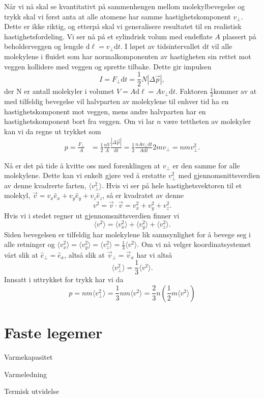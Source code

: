\documentclass[a4paper,norsk,12pt]{article}
\def\d{\ensuremath{\text{d}}}
\def\half{\ensuremath{\frac{1}{2}}}
\begin{document}
Når vi nå skal se kvantitativt på sammenhengen mellom molekylbevegelse og trykk skal vi først anta at alle atomene har samme hastighetskomponent $v_\perp$. Dette er ikke riktig, og etterpå skal vi generalisere resultatet til en realistisk hastighetsfordeling.
Vi ser nå på et sylindrisk volum med endeflate $A$ plassert på beholderveggen og lengde $\d\ell = v_\perp \d t$. I løpet av tidsintervallet $\d t$ vil alle molekylene i fluidet som har normalkomponenten av hastigheten sin rettet mot veggen kollidere med veggen og sprette tilbake. Dette gir impulsen
\begin{displaymath}
	I = F_\perp\d t = \half N|\Delta \vec{p}|,
\end{displaymath}
der N er antall molekyler i volumet $V = A\d\ell  = Av_\perp\d t$. Faktoren \half kommer av at med tilfeldig bevegelse vil halvparten av molekylene til enhver tid ha en hastighetskomponent mot veggen, mens andre halvparten har en hastighetskomponent bort fra veggen. Om vi lar $n$ være tettheten av molekyler kan vi da regne ut trykket som
\begin{displaymath}
\begin{aligned}
	p = \frac{F_\perp}{A} &= \half\frac{nV}{A}\frac{|\Delta \vec{p}|}{\d t} 
	= \half\frac{nAv_\perp\d t}{A\d t}2mv_\perp 
	= nmv_\perp^2.
\end{aligned}
\end{displaymath}

Nå er det på tide å kvitte oss med forenklingen at $v_\perp$ er den samme for alle molekylene. Dette kan vi enkelt gjøre ved å erstatte $v_\perp^2$ med gjennomsnittsverdien av denne kvadrerte farten, $\langle v_\perp^2\rangle$. Hvis vi ser på hele hastighetsvektoren til et molekyl, $\vec{v} = v_x \hat{e}_x +  v_y \hat{e}_y +  v_z \hat{e}_z$, så er kvadratet av denne
\begin{displaymath}
	v^2 = \vec{v}\cdot\vec{v} = v_x^2 + v_y^2+v_z^2.
\end{displaymath}
Hvis vi i stedet regner ut gjennomsnittsverdien finner vi
\begin{displaymath}
	\langle v^2\rangle =\langle v_x^2\rangle +\langle v_y^2\rangle + \langle v_z^2\rangle.
\end{displaymath}
Siden bevegelsen er tilfeldig har molekylene lik sannsynlighet for å bevege seg i alle retninger og $\langle v_x^2\rangle = \langle v_y^2\rangle = \langle v_z^2\rangle = \frac{1}{3}\langle v^2\rangle$. Om vi nå velger koordinatsystemet vårt slik at $\hat{e}_\perp = \hat{e}_x$, altså slik at $\vec{v}_\perp = \vec{v}_x$ har vi altså
\begin{displaymath}
	\langle v_\perp^2 \rangle =\frac{1}{3}\langle v^2 \rangle.
\end{displaymath}
Innsatt i uttrykket for trykk har vi da
\begin{displaymath}
	p = nm\langle v_\perp^2 \rangle = \frac{1}{3}nm\langle v^2 \rangle = \frac{2}{3}n\left(\frac{1}{2}m\langle v^2 \rangle\right)
\end{displaymath}

\section{Faste legemer}
Varmekapasitet

Varmeledning

Termisk utvidelse
\end{document}
